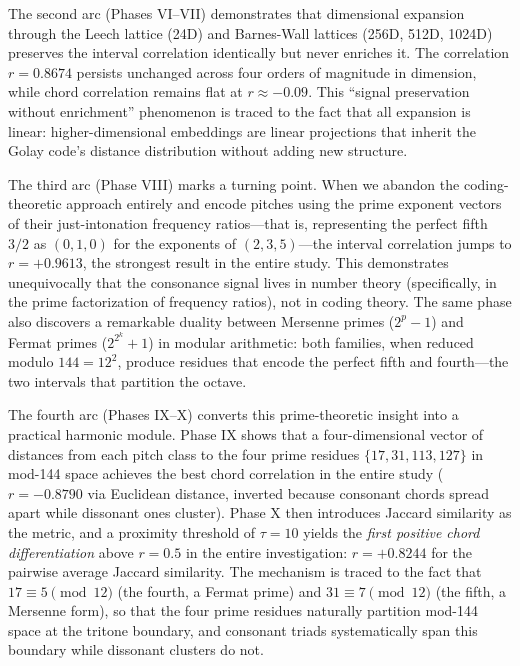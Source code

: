 \documentclass[11pt,a4paper]{article}
\theoremstyle{definition}
\begin{document}
The second arc (Phases VI--VII) demonstrates that dimensional expansion through the Leech lattice (24D) and Barnes-Wall lattices (256D, 512D, 1024D) preserves the interval correlation identically but never enriches it. The correlation $r = 0.8674$ persists unchanged across four orders of magnitude in dimension, while chord correlation remains flat at $r \approx -0.09$. This ``signal preservation without enrichment'' phenomenon is traced to the fact that all expansion is linear: higher-dimensional embeddings are linear projections that inherit the Golay code's distance distribution without adding new structure.

The third arc (Phase VIII) marks a turning point. When we abandon the coding-theoretic approach entirely and encode pitches using the prime exponent vectors of their just-intonation frequency ratios---that is, representing the perfect fifth $3/2$ as $(0, 1, 0)$ for the exponents of $(2, 3, 5)$---the interval correlation jumps to $r = +0.9613$, the strongest result in the entire study. This demonstrates unequivocally that the consonance signal lives in number theory (specifically, in the prime factorization of frequency ratios), not in coding theory. The same phase also discovers a remarkable duality between Mersenne primes ($2^p - 1$) and Fermat primes ($2^{2^k} + 1$) in modular arithmetic: both families, when reduced modulo $144 = 12^2$, produce residues that encode the perfect fifth and fourth---the two intervals that partition the octave.

The fourth arc (Phases IX--X) converts this prime-theoretic insight into a practical harmonic module. Phase IX shows that a four-dimensional vector of distances from each pitch class to the four prime residues $\{17, 31, 113, 127\}$ in mod-144 space achieves the best chord correlation in the entire study ($r = -0.8790$ via Euclidean distance, inverted because consonant chords spread apart while dissonant ones cluster). Phase X then introduces Jaccard similarity as the metric, and a proximity threshold of $\tau = 10$ yields the \emph{first positive chord differentiation} above $r = 0.5$ in the entire investigation: $r = +0.8244$ for the pairwise average Jaccard similarity. The mechanism is traced to the fact that $17 \equiv 5 \pmod{12}$ (the fourth, a Fermat prime) and $31 \equiv 7 \pmod{12}$ (the fifth, a Mersenne form), so that the four prime residues naturally partition mod-144 space at the tritone boundary, and consonant triads systematically span this boundary while dissonant clusters do not.
\end{document}
